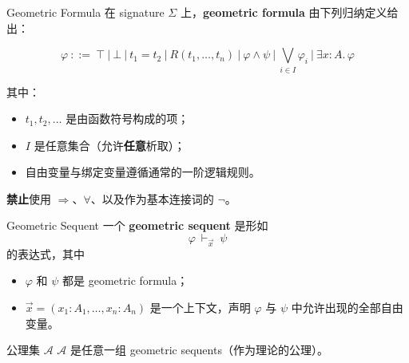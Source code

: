 \documentclass{beamer}
\begin{document}
\begin{frame}{Geometric Formula}
在 signature $\Sigma$ 上，\textbf{geometric formula} 由下列归纳定义给出：

\[
\varphi\ ::=\ 
\top
\ \big|\ 
\bot
\ \big|\ 
t_1 = t_2
\ \big|\ 
R(t_1,\dots,t_n)
\ \big|\ 
\varphi\wedge\psi
\ \big|\ 
\bigvee_{i\in I}\varphi_i
\ \big|\ 
\exists x:A.\,\varphi
\]

其中：
\begin{itemize}
    \item $t_1,t_2,\dots$ 是由函数符号构成的项；
    \item $I$ 是任意集合（允许\textbf{任意}析取）；
    \item 自由变量与绑定变量遵循通常的一阶逻辑规则。
\end{itemize}

\textbf{禁止}使用 $\Rightarrow$、$\forall$、以及作为基本连接词的 $\neg$。
\end{frame}

\begin{frame}{Geometric Sequent}
一个 \textbf{geometric sequent} 是形如
\[
\varphi\ \vdash_{\vec{x}}\ \psi
\]
的表达式，其中
\begin{itemize}
    \item $\varphi$ 和 $\psi$ 都是 geometric formula；
    \item $\vec{x} = (x_1:A_1,\dots,x_n:A_n)$ 是一个上下文，声明 $\varphi$ 与 $\psi$ 中允许出现的全部自由变量。
\end{itemize}
\end{frame}

\begin{frame}{公理集 $\mathcal{A}$}
$\mathcal{A}$ 是任意一组 geometric sequents（作为理论的公理）。
\end{frame}
\end{document}
